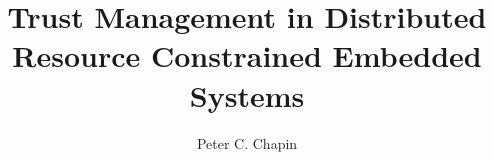 \documentclass[12pt]{report}
\newcommand{\primaryspacing}{\doublespace}
\begin{document}
\title{Trust Management in Distributed\\Resource Constrained Embedded Systems}
\author{Peter C. Chapin}
\maketitle

\makeacceptance
{}





\singlespace

\tableofcontents
\clearpage

\listoftables
\clearpage

\listoffigures
\clearpage

%

\primaryspacing
{}









\appendix


\clearpage






\primaryspacing

%
\end{document}
